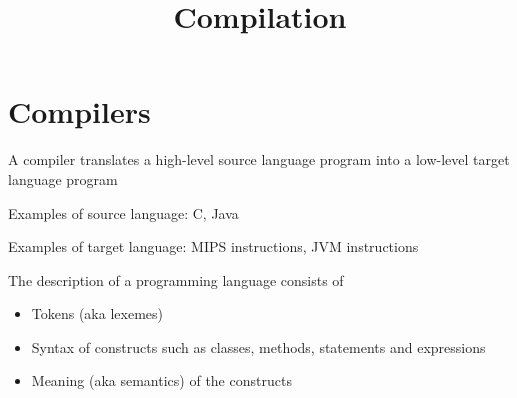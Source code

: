 \documentclass[8pt,a4paper,compress]{beamer}
\title{Compilation}
\date{}
\begin{document}
\begin{frame}
\vfill
\titlepage
\end{frame}

\section{Compilers}
\begin{frame}[fragile]
\pause\transdissolve

A compiler translates a high-level source language program into a low-level target language program

\begin{center}
\end{center}

\pause\transdissolve\bigskip

Examples of source language: C, Java

\pause\transdissolve\bigskip

Examples of target language: MIPS instructions, JVM instructions
\end{frame}

\begin{frame}[fragile]
\pause\transdissolve

The description of a programming language consists of
\begin{itemize}
\pause\transdissolve
\item Tokens (aka lexemes)

\pause\transdissolve
\item Syntax of constructs such as classes, methods, statements and expressions

\pause\transdissolve
\item Meaning (aka semantics) of the constructs
\end{itemize}
\end{frame}
\end{document}
